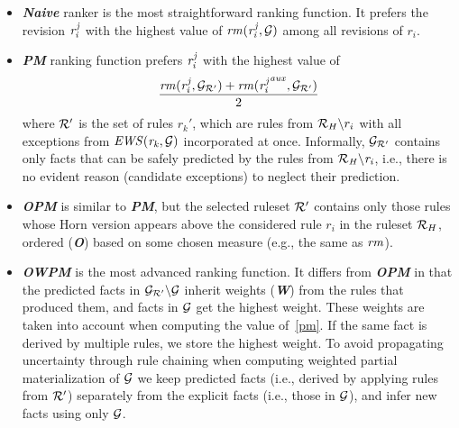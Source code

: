\begin{itemize}
    \item {\textbf{\em Naive}} ranker is the most straightforward ranking function. It prefers the revision $\mathit{r^j_i}$ with the highest value of $\mathit{rm(r^j_{i},\mathcal{G})}$ among all revisions of $r_i$.
    \item {\textbf{\em PM}} ranking function prefers $\mathit{r^j_i}$ with the highest value of
\begin{equation}
\label{pm}
\dfrac{\mathit{rm(r^j_i,\mathcal{G}_{\mathcal{R}'})+rm({r^j_i}^{aux},\mathcal{G}_{\mathcal{R}'})}}{2}
\end{equation}
 where $\mathcal{R}'$ is the set of rules $r_k'$, which are rules from $\mathcal{R}_H\backslash r_i$ with all exceptions from $\mathit{EWS(r_k,\mathcal{G})}$ incorporated at once. Informally, $\mathcal{G}_{\mathcal{R}'}$ contains only facts that can be safely predicted by the rules from $\mathit{\mathcal{R}_H\backslash r_i}$, i.e., there is no evident reason (candidate exceptions) to neglect their prediction.
    \item {\textbf{\em OPM}} is similar to \textbf{{\em PM}}, but the selected ruleset $\mathcal{R}'$ contains only those rules whose Horn version appears above the considered rule $r_i$ in the ruleset $\mathcal{R}_H$, ordered (\textbf{\em O}) based on some chosen measure (e.g., the same as $\mathit{rm}$). %
\smallskip

    \item {\textbf{\em OWPM}} is the most advanced ranking function. It differs from \textbf{\em OPM} in that the predicted facts in $\mathcal{G}_{\mathcal{R}'}\backslash \mathcal{G}$ inherit weights (\textbf{\em W}) from the rules that produced them, and facts in $\mathcal{G}$ get the highest weight. These weights are taken into account when computing the value of~\ref{pm}. If the same fact is derived by multiple rules, we store the highest weight. To avoid propagating uncertainty through rule chaining when computing weighted partial materialization of $\mathcal{G}$ we keep predicted facts (i.e., derived by applying rules from $\mathcal{R}'$) separately from the explicit facts (i.e., those in $\mathcal{G}$), and infer new facts using only $\mathcal{G}$.
\end{itemize}


